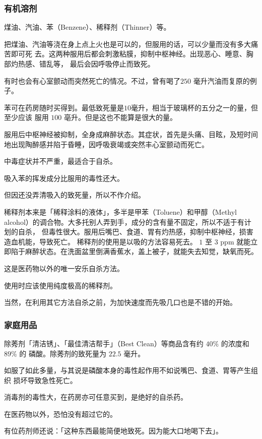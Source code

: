 \documentclass[UTF8]{ctexart}
\begin{document}
\subsubsection{有机溶剂}

煤油、汽油、苯（Benzene）、稀释剂（Thinner）等。

把煤油、汽油等浇在身上点上火也是可以的，但服用的话，可以少量而没有多大痛苦即可死
去。这两种服用后都会刺激粘膜，抑制中枢神经。出现恶心、睡意、胸部灼热感、错乱等，
最后会因呼吸停止而致死。  

有时也会有心室颤动而突然死亡的情况。不过，曾有喝了$250$
毫升汽油而复原的例子。

苯可在药房随时买得到。最低致死量是$10$毫升，相当于玻璃杯的五分之一的量，但至少应该
服用 $100$ 亳升。但是这也不能算是很大的量。

服用后中枢神经被抑制，全身成麻醉状态。其症状，首先是头痛、目眩，及短时间地出现陶醉感并陷于昏睡，因呼吸衰竭或突然丰心室颤动而死亡。

中毒症状并不严重，最适合于自杀。

吸入苯的挥发成分比服用的毒性还大。

但因还没弄清吸入的致死量，所以不作介绍。

稀释剂本来是「稀释涂料的液体」，多半是甲苯（Toluene）和甲醇（Methyl alcohol）的调合物。大多托别人弄到手，成分的含有量不固定，所以不适于有计划的自杀，
但毒性很大。服用后嘴巴、食道、胃有灼热感，抑制中枢神经，损害造血机能，导致死亡。
稀释剂的使用是以吸的方法容易死去。 $1$ 至 $3$ ppm 就能立即陷于麻醉状态。在洗面盆里倒满香蕉水，盖上被子，就能失去知觉，缺氧而死。

这是医药物以外的唯一安乐自杀方法。

使用时应该使用纯度极高的稀释剂。

当然，在利用其它方法自杀之前，为加快速度而先吸几口也是不错的开始。

\subsubsection{家庭用品}

除莠剂「清洁锈」、「最佳清洁帮手」（Best Clean）等商品含有约 $40\%$ 的浓度和 $89\%$ 的
磷酸。除莠剂的致死量为 $22.5$ 毫升。

如服了如此多量，与其说是磷酸本身的毒性起作用不如说嘴巴、食道、胃等产生组织
损坏导致急性死亡。

消毒剂的毒性大，在药房亦可任意买到，是绝好的自杀药。

在医药物以外，恐怕没有超过它的。

有位药剂师还说：「这种东西最能简便地致死。因为能大口地喝下去」。
\end{document}
